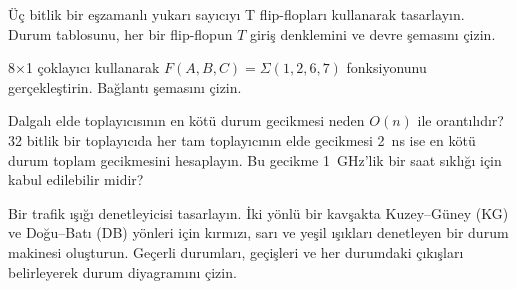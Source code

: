 \begin{alistirma}[\zor]
Üç bitlik bir eşzamanlı yukarı sayıcıyı T flip-flopları kullanarak tasarlayın. Durum tablosunu, her bir flip-flopun $T$ giriş denklemini ve devre şemasını çizin.
\end{alistirma}

\begin{alistirma}[\zor]
8×1 çoklayıcı kullanarak $F(A, B, C) = \Sigma(1, 2, 6, 7)$ fonksiyonunu gerçekleştirin. Bağlantı şemasını çizin.
\end{alistirma}

\begin{alistirma}[\zor]
Dalgalı elde toplayıcısının en kötü durum gecikmesi neden $O(n)$ ile orantılıdır? 32 bitlik bir toplayıcıda her tam toplayıcının elde gecikmesi 2~ns ise en kötü durum toplam gecikmesini hesaplayın. Bu gecikme 1~GHz'lik bir saat sıklığı için kabul edilebilir midir?
\end{alistirma}

\begin{alistirma}[\zor]
Bir trafik ışığı denetleyicisi tasarlayın. İki yönlü bir kavşakta Kuzey--Güney (KG) ve Doğu--Batı (DB) yönleri için kırmızı, sarı ve yeşil ışıkları denetleyen bir durum makinesi oluşturun. Geçerli durumları, geçişleri ve her durumdaki çıkışları belirleyerek durum diyagramını çizin.
\end{alistirma}
